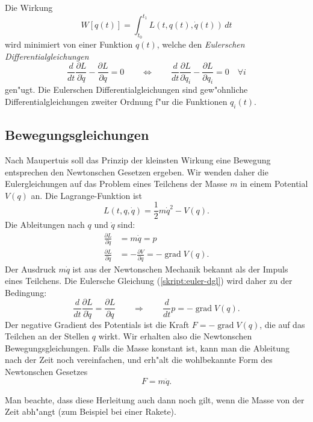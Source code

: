 \begin{satz}
Die Wirkung
\[
W[q(t)] =\int_{t_0}^{t_1} L(t, q(t), \dot q(t))\,dt
\]
wird minimiert von einer Funktion $q(t)$, welche den 
{\em Eulerschen Differentialgleichungen}
\begin{equation}
\frac{d}{dt}\frac{\partial L}{\partial \dot q}-\frac{\partial L}{\partial q}=0
\qquad\Leftrightarrow\qquad
\frac{d}{dt}\frac{\partial L}{\partial \dot q_i}-\frac{\partial L}{\partial q_i}=0\quad\forall i
\label{skript:euler-dgl}
\end{equation}
gen"ugt.
Die Eulerschen Differentialgleichungen sind gew"ohnliche
Differentialgleichungen zweiter Ordnung f"ur die Funktionen $q_i(t)$.
\end{satz}

\subsection{Bewegungsgleichungen}
Nach Maupertuis soll das Prinzip der kleinsten Wirkung eine Bewegung
entsprechen den Newtonschen Gesetzen ergeben.
Wir wenden daher die Eulergleichungen auf das Problem eines Teilchens der
Masse $m$ in einem Potential $V(q)$ an. Die Lagrange-Funktion ist
\[
L(t, q, \dot q)=\frac12m\dot q^2-V(q).
\]
Die Ableitungen nach $q$ und $\dot q$ sind:
\begin{align*}
\frac{\partial L}{\partial \dot q}&=m\dot q=p\\
\frac{\partial L}{\partial q}&=-\frac{\partial V}{\partial q}=-\operatorname{grad}V(q).
\end{align*}
Der Ausdruck $m\dot q$ ist aus der Newtonschen Mechanik bekannt als
der Impuls eines Teilchens.
Die Eulersche Gleichung (\ref{skript:euler-dgl}) wird daher zu
der Bedingung:
\[
\frac{d}{dt}\frac{\partial L}{\partial \dot q}=\frac{\partial L}{\partial q}
\qquad\Rightarrow\qquad
\frac{d}{dt}p=-\operatorname{grad}V(q).
\]
Der negative Gradient des Potentials ist die Kraft $F=-\operatorname{grad}V(q)$,
die auf das Teilchen an der Stellen $q$ wirkt.
Wir erhalten also die Newtonschen Bewegungsgleichungen.
Falls die Masse konstant ist, kann man die Ableitung nach der Zeit
noch vereinfachen, und erh"alt die wohlbekannte Form des Newtonschen
Gesetzes
\[
F= m\ddot q.
\]

Man beachte, dass diese Herleitung auch dann noch gilt, wenn die Masse von der
Zeit abh"angt (zum Beispiel bei einer Rakete).

